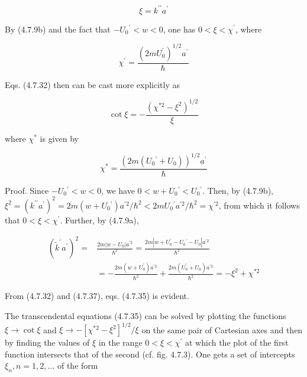 \documentclass{article}
\begin{document}
\begin{equation*}
\xi=k^{\prime \prime} a^{\prime} \tag{4.7.33}
\end{equation*}
 

By (4.7.9b) and the fact that $-U_{0}{ }^{\prime}<w<0$, one has $0<\xi<\chi^{\prime}$, where
 
\begin{equation*}
\chi^{\prime}=\frac{\left(2 m U_{0}^{\prime}\right)^{1 / 2} a^{\prime}}{\hbar} \tag{4.7.34}
\end{equation*}
 

Eqs. (4.7.32) then can be cast more explicitly as
 
\begin{equation*}
\cot \xi=-\frac{\left(\chi^{* 2}-\xi^{2}\right)^{1 / 2}}{\xi} \tag{4.7.35}
\end{equation*}
 
where $\chi^{*}$ is given by
 
\begin{equation*}
\chi^{*}=\frac{\left(2 m\left(U_{0}{ }^{\prime}+U_{0}\right)\right)^{1 / 2} a^{\prime}}{\hbar} \tag{4.7.36}
\end{equation*}
 

Proof. Since $-U_{0}{ }^{\prime}<w<0$, we have $0<w+U_{0}{ }^{\prime}<U_{0}{ }^{\prime}$. Then, by (4.7.9b), $\xi^{2}=\left(k^{\prime \prime} a^{\prime}\right)^{2}=2 m\left(w+U_{0}{ }^{\prime}\right) a^{\prime 2} / \hbar^{2}<2 m U_{0}{ }^{\prime} a^{\prime 2} / \hbar^{2}=\chi^{\prime 2}$, from which it follows that $0<\xi<\chi^{\prime}$. Further, by (4.7.9a),
 
\begin{align*}
\left(\tilde{k}^{\prime} a^{\prime}\right)^{2}= & \frac{2 m\left|w-U_{0}\right| a^{\prime 2}}{\hbar^{2}}=\frac{2 m\left|w+U_{0}^{\prime}-U_{0}{ }^{\prime}-U_{0}\right| a^{\prime 2}}{\hbar^{2}}  \tag{4.7.37}\\
& =-\frac{2 m\left(w+U_{0}^{\prime}\right) a^{\prime 2}}{\hbar^{2}}+\frac{2 m\left(U_{0}^{\prime}+U_{0}\right) a^{\prime 2}}{\hbar^{2}}=-\xi^{2}+\chi^{* 2}
\end{align*}
 

From (4.7.32) and (4.7.37), eqs. (4.7.35) is evident.

The transcendental equations (4.7.35) can be solved by plotting the functions $\xi \rightarrow \cot \xi$ and $\xi \rightarrow-\left[\chi^{* 2}-\xi^{2}\right]^{1 / 2} / \xi$ on the same pair of Cartesian axes and then by finding the values of $\xi$ in the range $0<\xi<\chi^{\prime}$ at which the plot of the first function intersects that of the second (cf. fig. 4.7.3). One gets a set of intercepts $\xi_{n}, n=1,2, \ldots$ of the form
 
\end{document}
